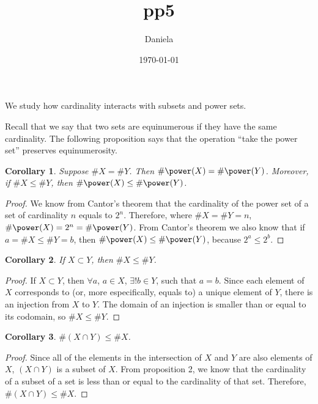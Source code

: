 \documentclass[11pt,reqno,oneside,a4paper]{article}
\title{pp5}
\author{Daniela}
\date{\today}
\newtheorem{corollary}{Corollary}[theorem]
\begin{document}
\maketitle

We study how cardinality interacts with subsets and power sets.

Recall that we say that two sets are equinumerous if they have the same cardinality.
The following proposition says that the operation ``take the power set'' preserves equinumerosity.
	
\begin{corollary} \label{proposition:PowerSetsPreserveEquinumerosity}
	Suppose $\# X=\# Y$.
	Then $\# \power(X)=\# \power(Y)$.
	Moreover, if $\# X\leq\# Y$, then $\# \power(X)\leq\# \power(Y)$.
\end{corollary}

\begin{proof}
We know from Cantor's theorem that the cardinality of the power set of a set of cardinality $n$ equals to $2^n$. Therefore, where $\# X=\# Y = n $, $\# \power(X)= 2^n = \# \power(Y)$. From Cantor's theorem we also know that  if $a = \# X\leq\# Y = b$, then $\# \power(X)\leq\# \power(Y)$, because $2^a \leq 2^b$.
\end{proof}

\begin{corollary} \label{prop:SubsetCardinality}
	If $X\subset Y$, then $\# X\leq \# Y$.
\end{corollary}

\begin{proof}
If $X\subset Y$, then $\forall a$, $a \in X$, $	\exists! b \in Y$, such that $a=b$. Since each element of $X$ corresponds to (or, more especifically, equals to) a unique element of $Y$, there is an injection from $X$ to $Y$. The domain of an injection is smaller than or equal to its codomain, so  $\# X\leq \# Y$.
\end{proof}

\begin{corollary} \label{cor:IntersectionCardinality}
	$\# (X\cap Y) \leq \# X$.
\end{corollary}

\begin{proof}
Since all of the elements in the intersection of $X$ and $Y$ are also elements of $X$, $(X \cap Y)$ is a subset of $X$. From proposition 2, we know that the cardinality of a subset of a set is less than or equal to the cardinality of that set. Therefore, $\#(X\cap Y) \leq \#X$.
\end{proof}
\end{document}
